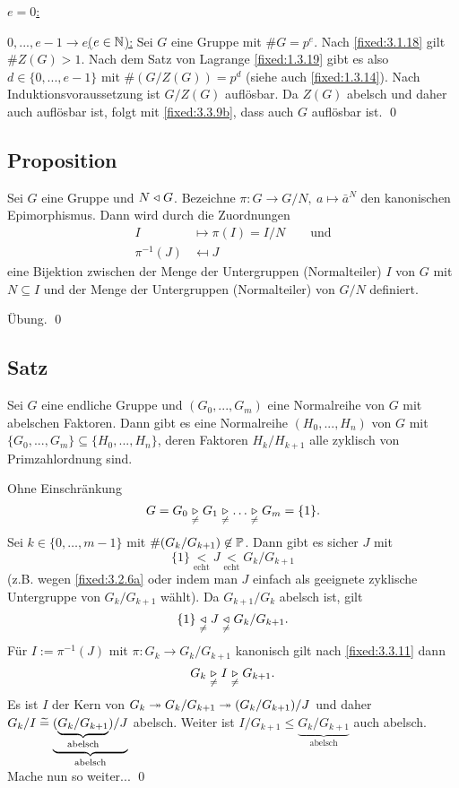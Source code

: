 \underline{$e=0$:} \checkmark

\underline{$0,...,e-1\to e$\quad($e\in\N$):} Sei $G$ eine Gruppe mit $\#G=p^e$. Nach \ref{fixed:3.1.18} gilt $\#Z(G)>1$. Nach dem Satz von Lagrange \ref{fixed:1.3.19} gibt es also $d\in\{0,...,e-1\}$ mit $\#(G/Z(G))=p^d$ (siehe auch \ref{fixed:1.3.14}). Nach Induktionsvoraussetzung ist $G/Z(G)$ auflösbar. Da $Z(G)$ abelsch und daher auch auflösbar ist, folgt mit \ref{fixed:3.3.9b}, dass auch $G$ auflösbar ist. \qed

\subsection{Proposition} Sei $G$ eine Gruppe und $N \normsub G$. Bezeichne $\pi : G\to G/N,\ a \mapsto \bar a^N$ den kanonischen Epimorphismus. Dann wird durch die Zuordnungen
\begin{align*}
	I & \mapsto\pi(I)=I/N\qquad\text{und} \\
	\pi^{-1}(J) & \mapsfrom J
\end{align*}
eine Bijektion zwischen der Menge der Untergruppen (Normalteiler) $I$ von $G$ mit $N\subseteq I$ und der Menge der Untergruppen (Normalteiler) von $G/N$ definiert.

\proof Übung. \qed

\subsection{Satz} Sei $G$ eine endliche Gruppe und $(G_0,...,G_m)$ eine Normalreihe von $G$ mit abelschen Faktoren. Dann gibt es eine Normalreihe $(H_0,...,H_n)$ von $G$ mit $\{G_0,...,G_m\}\subseteq\{H_0,...,H_n\}$, deren Faktoren $H_k/H_{k+1}$ alle
zyklisch von Primzahlordnung sind.

\proof Ohne Einschränkung
$$G=G_0\underset\ne\normsup G_1\underset\ne\normsup\dots\underset\ne\normsup G_m=\{1\}.$$
Sei $k\in\{0,\dots,m-1\}$ mit $\#(G_k/G_{k+1})\not\in\P$. Dann gibt es sicher $J$ mit $$\{1\}\underset{\text{echt}}<J\underset{\text{echt}}<G_k/G_{k+1}$$ (z.B. wegen \ref{fixed:3.2.6a} oder indem man $J$ einfach als geeignete zyklische Untergruppe von $G_k/G_{k+1}$ wählt). Da $G_{k+1}/G_k$ abelsch ist, gilt
$$\{1\}\underset\ne\normsub J\underset\ne\normsub G_k/G_{k+1}.$$
Für $I:=\pi^{-1}(J)$ mit $\pi : G_k\to G_k/G_{k+1}$ kanonisch gilt nach \ref{fixed:3.3.11} dann
$$G_k\underset\ne\normsup I\underset\ne\normsup G_{k+1}.$$
Es ist $I$ der Kern von $G_k\MAPepi G_k/G_{k+1}\MAPepi(G_k/G_{k+1})/J$ und daher $G_k/I\eqtilde\underbrace{(\underbrace{G_k/G_{k+1}}_{\text{abelsch}})/J}_{\text{abelsch}}$ abelsch. Weiter ist $I/G_{k+1}\le\underbrace{G_k/G_{k+1}}_{\text{abelsch}}$ auch abelsch. Mache nun so weiter... \qed